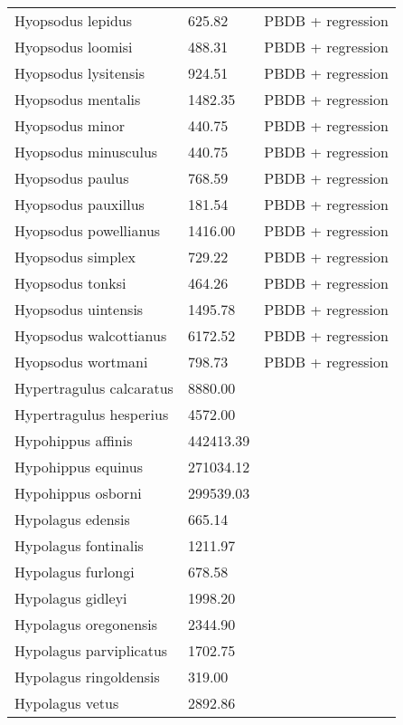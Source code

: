 \documentclass{article}
\begin{document}
\begin{center}
\begin{longtable}{p{} p{} p{}}
    Hyopsodus lepidus & 625.82 & PBDB + regression \\ 
    Hyopsodus loomisi & 488.31 & PBDB + regression \\ 
    Hyopsodus lysitensis & 924.51 & PBDB + regression \\ 
    Hyopsodus mentalis & 1482.35 & PBDB + regression \\ 
    Hyopsodus minor & 440.75 & PBDB + regression \\ 
    Hyopsodus minusculus & 440.75 & PBDB + regression \\ 
    Hyopsodus paulus & 768.59 & PBDB + regression \\ 
    Hyopsodus pauxillus & 181.54 & PBDB + regression \\ 
    Hyopsodus powellianus & 1416.00 & PBDB + regression \\ 
    Hyopsodus simplex & 729.22 & PBDB + regression \\ 
    Hyopsodus tonksi & 464.26 & PBDB + regression \\ 
    Hyopsodus uintensis & 1495.78 & PBDB + regression \\ 
    Hyopsodus walcottianus & 6172.52 & PBDB + regression \\ 
    Hyopsodus wortmani & 798.73 & PBDB + regression \\ 
    Hypertragulus calcaratus & 8880.00 & \cite{McKenna2011} \\ 
    Hypertragulus hesperius & 4572.00 & \cite{McKenna2011} \\ 
    Hypohippus affinis & 442413.39 & \cite{Tomiya2013} \\ 
    Hypohippus equinus & 271034.12 & \cite{Tomiya2013} \\ 
    Hypohippus osborni & 299539.03 & \cite{Tomiya2013} \\ 
    Hypolagus edensis & 665.14 & \cite{Tomiya2013} \\ 
    Hypolagus fontinalis & 1211.97 & \cite{Tomiya2013} \\ 
    Hypolagus furlongi & 678.58 & \cite{Tomiya2013} \\ 
    Hypolagus gidleyi & 1998.20 & \cite{Tomiya2013} \\ 
    Hypolagus oregonensis & 2344.90 & \cite{Tomiya2013} \\ 
    Hypolagus parviplicatus & 1702.75 & \cite{Tomiya2013} \\ 
    Hypolagus ringoldensis & 319.00 & \cite{McKenna2011} \\ 
    Hypolagus vetus & 2892.86 & \cite{Tomiya2013} \\ 

\end{longtable}
\end{center}
\end{document}
